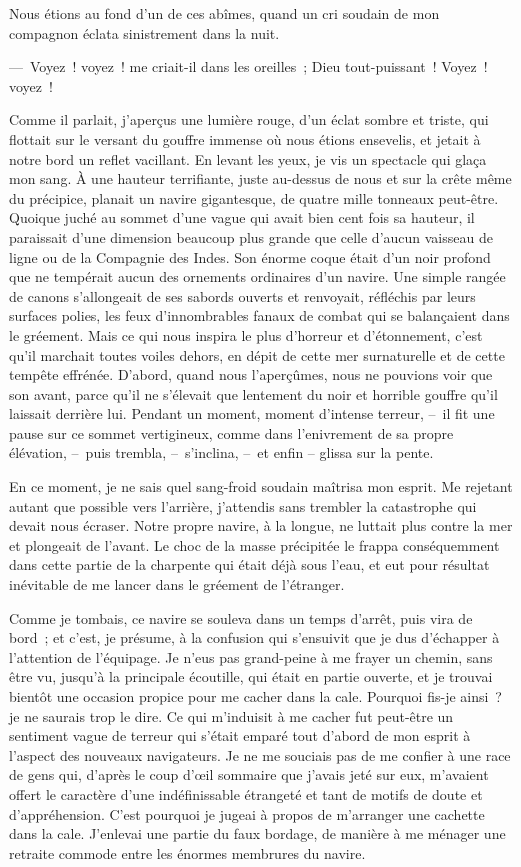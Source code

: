 \documentclass[french,twoside]{book} %
\begin{document}
Nous étions au fond d’un de ces abîmes, quand un cri soudain de mon compagnon éclata sinistrement dans la nuit.\par
— Voyez ! voyez ! me criait-il dans les oreilles ; Dieu tout-puissant ! Voyez ! voyez !\par
Comme il parlait, j’aperçus une lumière rouge, d’un éclat sombre et triste, qui flottait sur le versant du gouffre immense où nous étions ensevelis, et jetait à notre bord un reflet vacillant. En levant les yeux, je vis un spectacle qui glaça mon sang. À une hauteur terrifiante, juste au-dessus de nous et sur la crête même du précipice, planait un navire gigantesque, de quatre mille tonneaux peut-être. Quoique juché au sommet d’une vague qui avait bien cent fois sa hauteur, il paraissait d’une dimension beaucoup plus grande que celle d’aucun vaisseau de ligne ou de la Compagnie des Indes. Son énorme coque était d’un noir profond que ne tempérait aucun des ornements ordinaires d’un navire. Une simple rangée de canons s’allongeait de ses sabords ouverts et renvoyait, réfléchis par leurs surfaces polies, les feux d’innombrables fanaux de combat qui se balançaient dans le gréement. Mais ce qui nous inspira le plus d’horreur et d’étonnement, c’est qu’il marchait toutes voiles dehors, en dépit de cette mer surnaturelle et de cette tempête effrénée. D’abord, quand nous l’aperçûmes, nous ne pouvions voir que son avant, parce qu’il ne s’élevait que lentement du noir et horrible gouffre qu’il laissait derrière lui. Pendant un moment, moment d’intense terreur, – il fit une pause sur ce sommet vertigineux, comme dans l’enivrement de sa propre élévation, – puis trembla, – s’inclina, – et enfin – glissa sur la pente.\par
En ce moment, je ne sais quel sang-froid soudain maîtrisa mon esprit. Me rejetant autant que possible vers l’arrière, j’attendis sans trembler la catastrophe qui devait nous écraser. Notre propre navire, à la longue, ne luttait plus contre la mer et plongeait de l’avant. Le choc de la masse précipitée le frappa conséquemment dans cette partie de la charpente qui était déjà sous l’eau, et eut pour résultat inévitable de me lancer dans le gréement de l’étranger.\par
Comme je tombais, ce navire se souleva dans un temps d’arrêt, puis vira de bord ; et c’est, je présume, à la confusion qui s’ensuivit que je dus d’échapper à l’attention de l’équipage. Je n’eus pas grand-peine à me frayer un chemin, sans être vu, jusqu’à la principale écoutille, qui était en partie ouverte, et je trouvai bientôt une occasion propice pour me cacher dans la cale. Pourquoi fis-je ainsi ? je ne saurais trop le dire. Ce qui m’induisit à me cacher fut peut-être un sentiment vague de terreur qui s’était emparé tout d’abord de mon esprit à l’aspect des nouveaux navigateurs. Je ne me souciais pas de me confier à une race de gens qui, d’après le coup d’œil sommaire que j’avais jeté sur eux, m’avaient offert le caractère d’une indéfinissable étrangeté et tant de motifs de doute et d’appréhension. C’est pourquoi je jugeai à propos de m’arranger une cachette dans la cale. J’enlevai une partie du faux bordage, de manière à me ménager une retraite commode entre les énormes membrures du navire.\par
\end{document}
